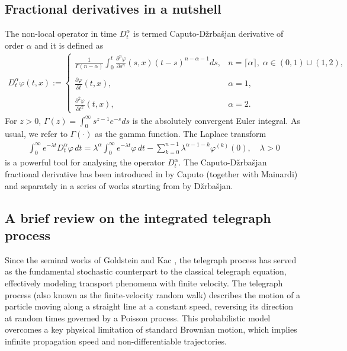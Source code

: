 \documentclass[10pt,a4paper]{article}
\numberwithin{equation}{section}
\theoremstyle{plain}
\theoremstyle{remark}
\begin{document}
\subsection{Fractional derivatives in a nutshell}
 
The non-local operator in time $D^\alpha_t$ is termed Caputo-D\v{z}rba\v{s}jan derivative of order $\alpha$ and it is defined as 
\begin{align}
D^\alpha_t \varphi(t,x) :=
\left\lbrace
\begin{array}{ll}
\displaystyle  \frac{1}{\Gamma(n-\alpha)} \int_0^t \frac{\partial^n \varphi}{\partial s^n}(s,x) (t-s)^{n-\alpha-1} ds, & n = \lceil \alpha \rceil,\; \alpha \in (0,1) \cup (1,2), \\
\\
\displaystyle \frac{\partial \varphi}{\partial t}(t,x), & \alpha=1,\\
\\
\displaystyle \frac{\partial^2 \varphi}{\partial t^2}(t,x), & \alpha=2.
\end{array}
\right.
\label{CDderDef}
\end{align}  
For $z>0$, $\Gamma(z) = \int_0^\infty s^{z-1} e^{-s}ds$ is the absolutely convergent Euler integral. As usual, we refer to $\Gamma(\cdot)$ as the gamma function. The Laplace transform 
\begin{align}
\int_0^\infty e^{-\lambda t} D_t^{\alpha} \varphi\, dt = \lambda^{\alpha} \int_0^\infty e^{-\lambda t} \varphi\, dt - \sum_{k=0}^{n-1} \lambda^{\alpha -1-k}\varphi^{(k)}(0), \quad \lambda>0
\label{LAPder}
\end{align}
is a powerful tool for analysing the operator $D^\alpha_t$. The Caputo-D\v{z}rba\v{s}jan fractional derivative has been introduced in \cite{caputoBook, CapMai71, CapMai71b} by Caputo (together with Mainardi) and separately in a series of works starting from \cite{Dzh66, DzhNers68} by D\v{z}rba\v{s}jan.


\subsection{A brief review on the integrated telegraph process}
\label{sec:introTel}

Since the seminal works of Goldstein \cite{Goldstein51} and Kac \cite{Kac74}, the telegraph process has served as the fundamental stochastic counterpart to the classical telegraph equation, effectively modeling transport phenomena with finite velocity. The telegraph process (also known as the finite-velocity random walk) describes the motion of a particle moving along a straight line at a constant speed, reversing its direction at random times governed by a Poisson process. This probabilistic model overcomes a key physical limitation of standard Brownian motion, which implies infinite propagation speed and non-differentiable trajectories. \\
\end{document}
